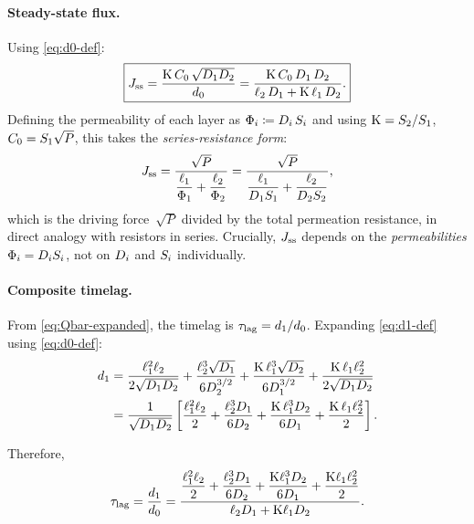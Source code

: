 \paragraph{Steady-state flux.}
Using \cref{eq:d0-def}:
\begin{equation}
  \label{eq:Jss-two-layer}
  \boxed{
  J_{\mathrm{ss}} = \frac{\mathrm{K}\,C_0\,\sqrt{D_{1}D_{2}}}{d_0}
  = \frac{\mathrm{K}\,C_0\,D_{1}\,D_{2}}
  {\ell_{2}\,D_{1} + \mathrm{K}\,\ell_{1}\,D_{2}}.}
\end{equation}
Defining the permeability of each layer as $\Phi_i \coloneqq D_{i}\,S_{i}$
and using $\mathrm{K} = S_{2}/S_{1}$, $C_0 = S_{1}\sqrt{P}$, this takes the
\emph{series-resistance form}:
\begin{equation}
  \label{eq:Jss-series}
  J_{\mathrm{ss}} = \frac{\sqrt{P}}{\dfrac{\ell_{1}}{\Phi_1}
  + \dfrac{\ell_{2}}{\Phi_2}}
  = \frac{\sqrt{P}}{\dfrac{\ell_{1}}{D_{1}S_{1}}
  + \dfrac{\ell_{2}}{D_{2}S_{2}}},
\end{equation}
which is the driving force~$\sqrt{P}$ divided by the total permeation
resistance, in direct analogy with resistors in series.  Crucially, $J_{\mathrm{ss}}$
depends on the \emph{permeabilities} $\Phi_i = D_{i}S_{i}$, not on $D_{i}$
and $S_{i}$ individually.

\paragraph{Composite timelag.}
From \cref{eq:Qbar-expanded}, the timelag is $\tau_{\mathrm{lag}} = d_1/d_0$.  Expanding
\cref{eq:d1-def} using \cref{eq:d0-def}:
\begin{align}
  d_1 &= \frac{\ell_{1}^2\ell_{2}}{2\sqrt{D_{1}D_{2}}}
    + \frac{\ell_{2}^3\sqrt{D_{1}}}{6D_{2}^{3/2}}
    + \frac{\mathrm{K}\,\ell_{1}^3\sqrt{D_{2}}}{6D_{1}^{3/2}}
    + \frac{\mathrm{K}\,\ell_{1}\ell_{2}^2}{2\sqrt{D_{1}D_{2}}}
  \notag\\
  &= \frac{1}{\sqrt{D_{1}D_{2}}}
  \left[\frac{\ell_{1}^2\ell_{2}}{2}
    + \frac{\ell_{2}^3D_{1}}{6D_{2}}
    + \frac{\mathrm{K}\,\ell_{1}^3D_{2}}{6D_{1}}
    + \frac{\mathrm{K}\,\ell_{1}\ell_{2}^2}{2}\right].
\end{align}

Therefore,
\begin{equation}
  \label{eq:tlag-composite-raw}
  \tau_{\mathrm{lag}} = \frac{d_1}{d_0}
  = \frac{\dfrac{\ell_{1}^2\ell_{2}}{2}
    + \dfrac{\ell_{2}^3D_{1}}{6D_{2}}
    + \dfrac{\mathrm{K}\ell_{1}^3D_{2}}{6D_{1}}
    + \dfrac{\mathrm{K}\ell_{1}\ell_{2}^2}{2}}
  {\ell_{2}D_{1} + \mathrm{K}\ell_{1}D_{2}}.
\end{equation}

